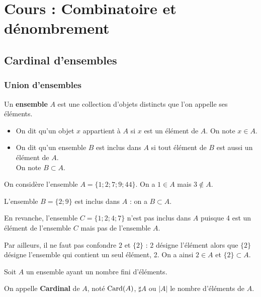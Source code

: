 \documentclass[11pt,fleqn, openany]{book} %
\begin{document}



\chapter{Cours : Combinatoire et dénombrement}


\section{Cardinal d'ensembles}

\subsection{Union d'ensembles}


\begin{definition}Un \textbf{ensemble} $A$ est une collection d'objets distincts que l'on appelle ses éléments.
\begin{itemize}
\item On dit qu'un objet $x$ appartient à $A$ si $x$ est un élément de $A$.  On note $x\in A$.
\item On dit qu'un ensemble $B$ est inclus dans $A$ si tout élément de $B$ est aussi un élément de $A$. \\On note $B \subset A$.
\end{itemize}\end{definition}

\begin{example}On considère l'ensemble $A=\{1;2;7;9;44\}$. On a $1 \in A$ mais $3 \not\in A$. 

L'ensemble $B=\{2;9\}$ est inclus dans $A$ : on a $B\subset A$. 

En revanche, l'ensemble $C=\{1;2;4;7\}$ n'est pas inclus dans $A$ puisque 4 est un élément de l'ensemble $C$ mais pas de l'ensemble $A$.

Par ailleurs, il ne faut pas confondre $2$ et $\{2\}$ : $2$ désigne l'élément alors que $\{2\}$ désigne l'ensemble qui contient un seul élément, 2. On a ainsi $2 \in A$ et $\{2\} \subset A$.\end{example}

\begin{definition}Soit $A$ un ensemble ayant un nombre fini d'éléments. 

On appelle \textbf{Cardinal} de $A$, noté $\mathrm{Card}(A)$, $\sharp A$ ou $|A|$ le nombre d'éléments de $A$.\end{definition}
\end{document}
